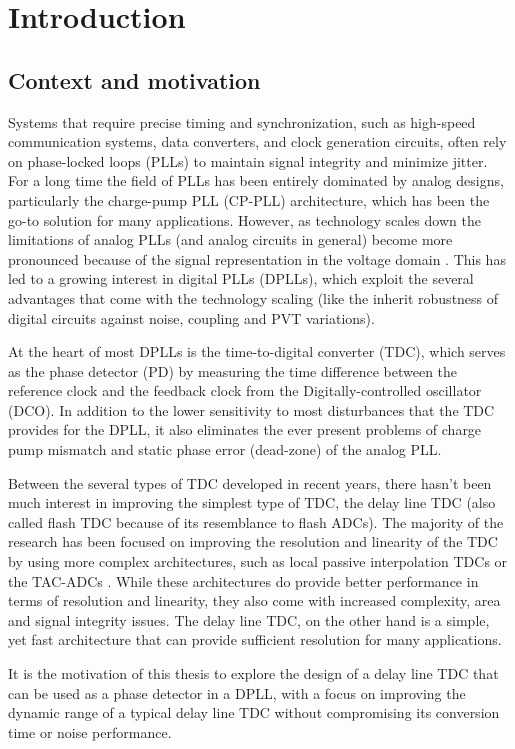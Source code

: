 \chapter{Introduction}
\section{Context and motivation}
Systems that require precise timing and synchronization, such as high-speed communication systems, data converters, and clock generation circuits, often rely on phase-locked loops (PLLs) to maintain
signal integrity and minimize jitter. For a long time the field of PLLs has been entirely dominated by analog designs, particularly the charge-pump PLL (CP-PLL) architecture, which has been the go-to
solution for many applications. However, as technology scales down the limitations of analog PLLs (and analog circuits in general) become more pronounced because of the signal representation
in the voltage domain \cite{Henzler2010}. This has led to a growing interest in digital PLLs (DPLLs), which exploit the several advantages that come with the technology scaling (like the inherit robustness of
digital circuits against noise, coupling and PVT variations).

At the heart of most DPLLs is the time-to-digital converter (TDC), which serves as the phase detector (PD) by measuring the time difference between the reference clock and the feedback clock from the
Digitally-controlled oscillator (DCO). In addition to the lower sensitivity to most disturbances that the TDC provides for the DPLL, it also eliminates the ever present problems of charge pump mismatch
and static phase error (dead-zone) of the analog PLL.

Between the several types of TDC developed in recent years, there hasn't been much interest in improving the simplest type of TDC, the delay line TDC (also called flash TDC because of its resemblance to flash ADCs).
The majority of the research has been focused on improving the resolution and linearity of the TDC by using more complex architectures, such as local passive interpolation TDCs \cite{Mantyniemi2009} or the TAC-ADCs
\cite{Kratyuk2006}. While these architectures do provide better performance in terms of resolution and linearity, they also come with increased complexity, area and signal integrity issues. The delay line TDC, on the
other hand is a simple, yet fast architecture that can provide sufficient resolution for many applications. 

It is the motivation of this thesis to explore the design of a delay line TDC that can be used as a phase detector in a DPLL, with a focus on improving the dynamic range of a typical delay line TDC without
compromising its conversion time or noise performance.

